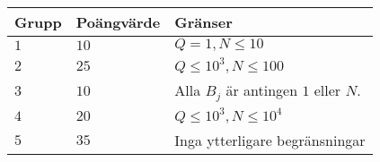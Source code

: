 \noindent
\begin{tabular}{| l | l | l |}
\hline
  Grupp & Poängvärde & Gränser \\ \hline
  $1$    & $10$       &  $Q=1, N \leqslant 10$ \\ \hline                 %
  $2$    & $25$       &  $Q\leqslant 10^3, N \leqslant 100$\\ \hline     %
  $3$    & $10$       &  Alla $B_j$ är antingen $1$ eller $N$. \\ \hline
  $4$    & $20$       &  $Q\leqslant 10^3, N \leqslant 10^4$ \\ \hline   %
  $5$    & $35$       &  Inga ytterligare begränsningar \\ \hline        %
\end{tabular}
